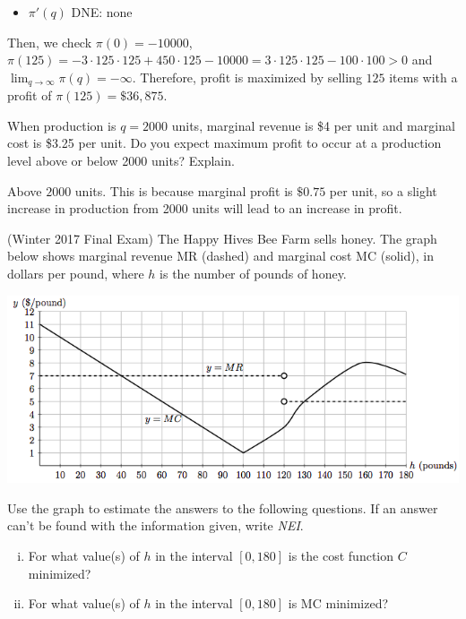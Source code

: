 \documentclass[11pt]{exam}
\begin{document}
\begin{questions}
\begin{solution}
\begin{itemize}
      \item \(\pi'(q)\) DNE: none
      \end{itemize}
      Then, we check \(\pi(0) = -10000\), \(\pi(125) = -3 \cdot 125
      \cdot 125 + 450 \cdot 125 -10000 = 3 \cdot 125 \cdot 125 - 100
      \cdot 100 > 0\) and \(\lim_{q\to\infty}
      \pi(q) = -\infty\). Therefore, profit is maximized by selling
      \(125\) items with a profit of \(\pi(125)= \$36,875\).
    \end{solution}
    \vspace{0.7in}
  \question When production is \(q=2000\) units, marginal revenue is
    \$4 per unit and marginal cost is \$3.25 per unit.  Do you expect
    maximum profit to occur at a production level above or below 2000 units? Explain.
    \begin{solution}
      Above \(2000\) units. This is because marginal profit is
      \(\$0.75\) per unit, so a slight increase in production from
      2000 units will
      lead to an increase in profit.
    \end{solution}
    \pagebreak
    \ifprintanswers 
    
    \else
    
    \fi
    \pagebreak
  \question (Winter 2017 Final Exam) %
    The Happy Hives Bee Farm sells honey. The graph below shows marginal revenue
MR (dashed) and marginal cost MC (solid), in dollars per pound, where $h$ is the number of
pounds of honey.
\begin{center}
  \includegraphics[scale=0.5]{Figures/bees}
\end{center}
Use the graph to estimate the answers to the following questions. If an answer can't be found with the information given, write \emph{NEI}.
	\begin{enumerate}[(i)]
		\item For what value(s) of $h$ in the interval $[0, 180]$ is the cost function $C$ minimized?
		\item For what value(s) of $h$ in the interval $[0, 180]$ is MC minimized?

\end{enumerate}
\end{questions}
\end{document}
